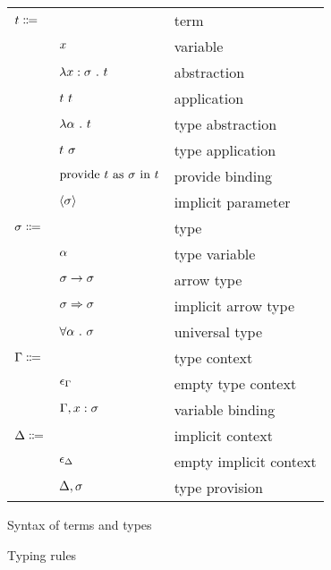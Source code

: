 \documentclass[acmlarge]{acmart}
\begin{document}
  \begin{figure}
    \begin{mdframed}

      \begin{tabular}{l l l}
        $t \Coloneqq $ & & term \\
        & $x$ & variable \\
        & $\lambda x : \sigma \ . \ t$ & abstraction \\
        & $t \ t$ & application \\
        & $\lambda \alpha \ . \ t$ & type abstraction \\
        & $t \ \sigma$ & type application \\
        & $\text{provide } t \text{ as } \sigma \text{ in } t$ & provide binding \\
        & $\left\langle \sigma \right\rangle$ & implicit parameter \\
        $\sigma \Coloneqq$ & & type \\
        & $\alpha$ & type variable \\
        & $\sigma \rightarrow \sigma$ & arrow type \\
        & $\sigma \Rightarrow \sigma$ & implicit arrow type \\
        & $\forall \alpha \ . \ \sigma$ & universal type \\
        $\Gamma \Coloneqq$ & & type context \\
        & $\epsilon_{\Gamma}$ & empty type context \\
        & $\Gamma, x : \sigma$ & variable binding \\
        $\Delta \Coloneqq$ & & implicit context \\
        & $\epsilon_{\Delta}$ & empty implicit context \\
        & $\Delta, \sigma$ & type provision
      \end{tabular}

      \caption{Syntax of terms and types}
      \label{fig:terms_syntax}

    \end{mdframed}
  \end{figure}

  \begin{figure}
    \begin{mdframed}

      \begin{center}
        \framebox{$\entails{\icontext; \gcontext}{\hastype{\lterm}{\tpoly}}$}
      \end{center}

      \medskip

      \caption{Typing rules}
      \label{fig:typing_rules}

    \end{mdframed}
  \end{figure}
\end{document}
